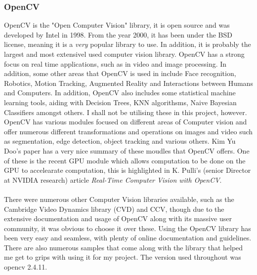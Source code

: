 \documentclass[11pt]{article}
\begin{document}
\subsubsection{OpenCV}
OpenCV is the "Open Computer Vision" library, it is open source and was
developed by Intel in 1998. From the year 2000, it has been under the BSD
license, meaning it is a \textit{very} popular library to use. In addition,
it is probably the largest and most extensivel used computer vision library.
OpenCV has a strong focus on real time applications, such as in video and
image processing. In addition, some other areas that
OpenCV is used in include Face recognition, Robotics, Motion Tracking, 
Augmented Reality and Interactions between Humans and Computers. In addition,
OpenCV also includes some statistical machine learning tools, aiding with
Decision Trees, KNN algorithsms, Naive Bayesian Classifiers amongst others. 
I shall not be utilising these in this project, however.
OpenCV has various modules focused on different areas of
Computer vision and offer numerous different transformations and operations
on images and video such as segmentation, edge detection, object tracking and
various others. Kim Yu Doo's paper\cite{Kim14} has a very nice summary of
these moudles that OpenCV offers. One of these is the recent GPU module which
allows computation to be done on the GPU to accelearate computation, this is
highlighted in K. Pulli's (senior Director at NVIDIA research) article  
\textit{Real-Time Computer Vision with OpenCV}\cite{Pulli12}.\\
\\
There were numerous other Computer Vision libraries available, such as 
the Cambridge Video Dynamics library (CVD) and CCV, though due to the extensive
documentation and usage of OpenCV along with its massive user
community, it was obvious to choose it over these. 
Using the OpenCV library has been very easy and seamless, with plenty
of online documentation and guidelines. There are also numerous samples
that come along with the library that helped me get to grips with using it 
for my project. The version used throughout was opencv 2.4.11.
\end{document}
